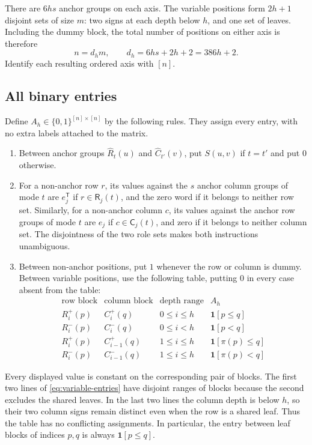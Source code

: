 There are $6hs$ anchor groups on each axis.  The variable positions
form $2h+1$ disjoint sets of size $m$: two signs at each depth below
$h$, and one set of leaves.  Including the dummy block, the total
number of positions on either axis is therefore
\begin{equation}
 n=d_hm,\qquad d_h=6hs+2h+2=386h+2.
 \label{eq:matrix-size}
\end{equation}
Identify each resulting ordered axis with $[n]$.

\subsection{All binary entries}

Define $A_h\in\{0,1\}^{[n]\times[n]}$ by the following rules.
They assign every entry, with no extra labels attached to the matrix.
\begin{enumerate}
 \item Between anchor groups $\widehat R_t(u)$ and
 $\widehat C_{t'}(v)$, put $S(u,v)$ if $t=t'$ and put $0$ otherwise.

 \item For a non-anchor row $r$, its values against the $s$ anchor
 column groups of mode $t$ are $e_j^{\mathsf T}$ if
 $r\in\mathsf R_j(t)$, and the zero word if it belongs to neither
 row set.  Similarly, for a non-anchor column $c$, its values against
 the anchor row groups of mode $t$ are $e_j$ if
 $c\in\mathsf C_j(t)$, and zero if it belongs to neither column set.
 The disjointness of the two role sets makes both instructions
 unambiguous.

 \item Between non-anchor positions, put $1$ whenever the row or
 column is dummy.  Between variable positions, use the following
 table, putting $0$ in every case absent from the table:
 \begin{equation}
  \begin{array}{ccc|c}
   \text{row block}&\text{column block}&\text{depth range}&A_h\\ \hline
   R_i^+(p)&C_i^+(q)&0\le i\le h&\mathbf1[p\le q]\\
   R_i^-(p)&C_i^-(q)&0\le i<h&\mathbf1[p<q]\\
   R_i^+(p)&C_{i-1}^+(q)&1\le i\le h&\mathbf1[\pi(p)\le q]\\
   R_i^-(p)&C_{i-1}^-(q)&1\le i\le h&\mathbf1[\pi(p)<q]
  \end{array}
  \label{eq:variable-entries}
 \end{equation}
\end{enumerate}
Every displayed value is constant on the corresponding pair of blocks.
The first two lines of \eqref{eq:variable-entries} have disjoint ranges
of blocks because the second excludes the shared leaves.  In the last
two lines the column depth is below $h$, so their two column signs
remain distinct even when the row is a shared leaf.  Thus the table
has no conflicting assignments.  In particular, the entry between
leaf blocks of indices $p,q$ is always $\mathbf1[p\le q]$.

